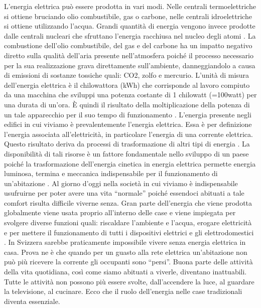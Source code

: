 L’energia elettrica può essere prodotta in vari modi. Nelle centrali termoelettriche si ottiene bruciando olio combustibile, gas o carbone, nelle centrali idroelettriche si ottiene utilizzando l’acqua. Grandi quantità di energia vengono invece prodotte dalle centrali nucleari che sfruttano l’energia racchiusa nel nucleo degli atomi .
La combustione dell’olio combustibile, del gas e del carbone ha un impatto negativo diretto sulla qualità dell’aria presente nell’atmosfera poiché il processo necessario per la sua realizzazione grava direttamente sull’ambiente, danneggiandolo a causa di emissioni di sostanze tossiche quali: CO2, zolfo e mercurio.
L’unità di misura dell’energia elettrica è il chilowattora (kWh) che corrisponde al lavoro compiuto da una macchina che sviluppi una potenza costante di 1 chilowatt (=100watt) per una durata di un’ora. È quindi il risultato della moltiplicazione della potenza di un tale apparecchio per il suo tempo di funzionamento . 
L’energia presente negli edifici in cui viviamo è prevalentemente l’energia elettrica. Essa è per definizione l’energia associata all’elettricità, in particolare l’energia di una corrente elettrica. Questo risultato deriva da processi di trasformazione di altri tipi di energia . 
La disponibilità di tali risorse è un fattore fondamentale nello sviluppo di un paese poiché la trasformazione dell’energia cinetica in energia elettrica permette energia luminosa, termina e meccanica indispensabile per il funzionamento di un’abitazione . 
Al giorno d’oggi nella società in cui viviamo è indispensabile usufruirne per poter avere una vita “normale” poiché essendoci abituati a tale comfort risulta difficile viverne senza.
Gran parte dell’energia che viene prodotta globalmente viene usata proprio all’interno delle case e viene impiegata per svolgere diverse funzioni quali: riscaldare l’ambiente e l’acqua, erogare elettricità e per mettere il funzionamento di tutti i dispositivi elettrici e gli elettrodomestici .
In Svizzera sarebbe praticamente impossibile vivere senza energia elettrica in casa. Prova ne è che quando per un guasto alla rete elettrica un’abitazione non può più ricevere la corrente gli occupanti sono “persi”. Buona parte delle attività della vita quotidiana, così come siamo abituati a viverle, diventano inattuabili. Tutte le attività non possono più essere svolte, dall’accendere la luce, al guardare la televisione, al cucinare. Ecco che il ruolo dell’energia nelle case tradizionali diventa essenziale.
